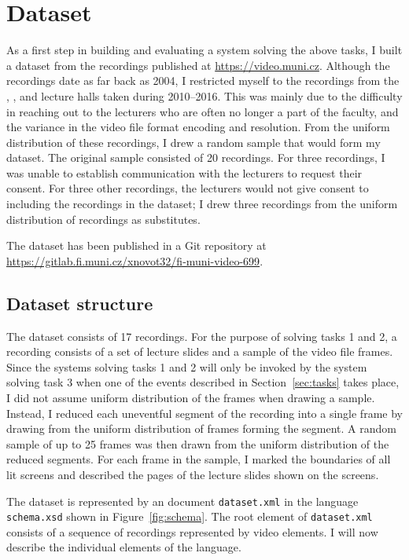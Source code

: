 \section{Dataset}
\label{sec:dataset}
As a first step in building and evaluating a system solving the above tasks, I
built a dataset from the recordings published at \url{https://video.muni.cz}.
Although the recordings date as far back as 2004, I restricted myself to the
recordings from the , , and  lecture halls taken
during 2010--2016. This was mainly due to the difficulty in reaching out to
the lecturers who are often no longer a part of the faculty, and the variance
in the video file format encoding and resolution. From the uniform distribution
of these recordings, I drew a random sample that would form my dataset.
The original sample consisted of 20 recordings. For three recordings, I was
unable to establish communication with the lecturers to request their consent.
For three other recordings, the lecturers would not give consent to including
the recordings in the dataset; I drew three recordings from the uniform
distribution of recordings as substitutes.

The dataset has been published in a Git repository at
\url{https://gitlab.fi.muni.cz/xnovot32/fi-muni-video-699}.

\subsection{Dataset structure}
The dataset consists of 17 recordings. For the purpose of solving tasks 1 and
2, a recording consists of a set of lecture slides and a sample of the video
file frames. Since the systems solving tasks 1 and 2 will only be invoked by
the system solving task 3 when one of the events described in
Section~\ref{sec:tasks} takes place, I did not assume uniform distribution of
the frames when drawing a sample. Instead, I reduced each uneventful segment of
the recording into a single frame by drawing from the uniform distribution of
frames forming the segment. A random sample of up to 25 frames was then drawn
from the uniform distribution of the reduced segments. For each frame in the
sample, I marked the boundaries of all lit screens and described the pages of
the lecture slides shown on the screens.

The dataset is represented by an  document \texttt{dataset.xml} in
the language \texttt{schema.xsd} shown in Figure~\ref{fig:schema}. The root
element of \texttt{dataset.xml} consists of a sequence of recordings
represented by video elements. I will now describe the individual elements of
the language.

